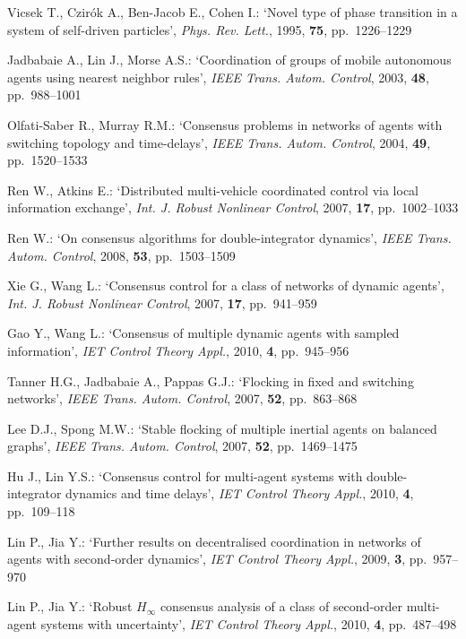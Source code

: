 \documentclass{cta-author}
\begin{document}
\begin{thebibliography}{99}

Vicsek T., Czir\'{o}k A., Ben-Jacob E., Cohen I.: `Novel type of phase transition in a system of self-driven particles', \textit{Phys. Rev. Lett.}, 1995, \textbf{75}, pp.~1226--1229

Jadbabaie A., Lin J., Morse A.S.: `Coordination of groups of
mobile autonomous agents using nearest neighbor rules', \textit{IEEE
Trans. Autom. Control}, 2003, \textbf{48}, pp.~988--1001

Olfati-Saber R., Murray R.M.: `Consensus problems in networks
of agents with switching topology and time-delays', \textit{IEEE Trans.
Autom. Control}, 2004, \textbf{49}, pp.~1520--1533

Ren W., Atkins E.: `Distributed multi-vehicle coordinated
control via local information exchange', \textit{Int. J. Robust
Nonlinear Control}, 2007, \textbf{17}, pp.~1002--1033

Ren W.: `On consensus algorithms for double-integrator dynamics',
\textit{IEEE Trans. Autom. Control}, 2008, \textbf{53}, pp.~1503--1509

Xie G., Wang L.: `Consensus control for a class of networks of
dynamic agents', \textit{Int. J. Robust Nonlinear Control}, 2007,
\textbf{17}, \hbox{pp.~941--959}

Gao Y., Wang L.: `Consensus of multiple dynamic agents with sampled information', \textit{IET Control
Theory Appl.}, 2010, \textbf{4}, pp.~945--956

Tanner H.G., Jadbabaie A., Pappas G.J.: `Flocking in fixed
and switching networks', \textit{IEEE Trans. Autom. Control}, 2007,
\textbf{52}, \hbox{pp.~863--868}

Lee D.J., Spong M.W.: `Stable flocking of multiple inertial
agents on balanced graphs', \textit{IEEE Trans. Autom. Control}, 2007,
\textbf{52}, \hbox{pp.~1469--1475}

Hu J., Lin Y.S.: `Consensus control for multi-agent systems with double-integrator dynamics and time delays', \textit{IET Control
Theory Appl.}, 2010, \textbf{4}, pp.~109--118

Lin P., Jia Y.: `Further results on decentralised coordination
in networks of agents with second-order dynamics', \textit{IET Control
Theory Appl.}, 2009, \textbf{3}, pp.~957--970

Lin P., Jia Y.: `Robust $H_{\infty}$ consensus analysis of a class of second-order multi-agent systems with uncertainty', \textit{IET Control
Theory Appl.}, 2010, \textbf{4}, pp.~487--498


\end{thebibliography}
\end{document}
